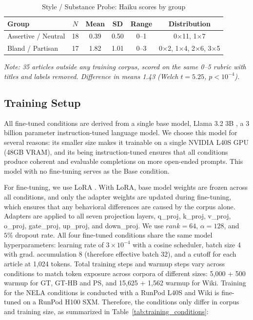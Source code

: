 \documentclass[12pt]{article}
\begin{document}
\begin{table}[htbp]
    \centering
    \caption{Style / Substance Probe: Haiku scores by group}
    \label{tab:style_probe}
    \begin{tabular}{lccccc}
      \toprule
      Group & $N$ & Mean & SD & Range & Distribution \\
      \midrule
      Assertive / Neutral  & 18 & 0.39 & 0.50 & 0--1 &
  0$\times$11, 1$\times$7 \\
      Bland / Partisan     & 17 & 1.82 & 1.01 & 0--3 &
  0$\times$2, 1$\times$4, 2$\times$6, 3$\times$5 \\
      \bottomrule
    \end{tabular}
    \vspace{4pt}

    {\small\textit{Note: 35 articles outside any training
  corpus, scored on the same 0--5
    rubric with titles and labels removed. Difference in means
  1.43 (Welch $t=5.25$,
    $p<10^{-4}$).}}
  \end{table}

\subsection{Training Setup}

All fine-tuned conditions are derived from a single base model, Llama 3.2 3B \cite{dubey2024llama}, a 3 billion parameter instruction-tuned language model. 
We choose this model for several reasons: its smaller size makes it trainable on a single NVIDIA L40S GPU (48GB VRAM), and its being instruction-tuned ensures that all conditions produce coherent and evaluable completions on more open-ended prompts. 
This model with no fine-tuning serves as the Base condition.

For fine-tuning, we use LoRA \cite{hu2021lora}. 
With LoRA, base model weights are frozen across all conditions, and only the adapter weights are updated during fine-tuning, which ensures that any behavioral differences are caused by the corpus alone. 
Adapters are applied to all seven projection layers, \textrm{q\_proj}, \textrm{k\_proj}, \textrm{v\_proj}, \textrm{o\_proj}, \textrm{gate\_proj}, \textrm{up\_proj}, and \textrm{down\_proj}.
We use $rank = 64$, $\alpha = 128$, and $5\%$ dropout rate. 
All four fine-tuned conditions share the same model hyperparameters: learning rate of $3 \times 10^{-4}$ with a cosine scheduler, batch size 4 with grad. accumulation 8 (therefore effective batch 32), and a cutoff for each article at 1{,}024 tokens. 
Total training steps and warmup steps vary across conditions to match token exposure across corpora of different sizes: 5{,}000 + 500 warmup for GT, GT-HB and PS, and 15{,}625 + 1{,}562 warmup for Wiki.
Training for the NELA conditions is conducted with a RunPod L40S and Wiki is fine-tuned on a RunPod H100 SXM. 
Therefore, the conditions only differ in corpus and training size, as summarized in Table~\ref{tab:training_conditions}:
\end{document}
